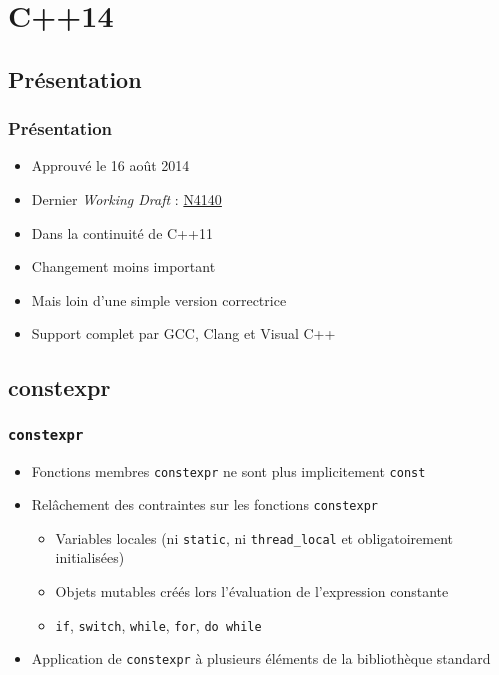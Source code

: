 \documentclass[C++.tex]{subfiles}
\begin{document}
\section{C++14}
\subsection*{Présentation}
\begin{frame}
	\frametitle{Présentation}
	\begin{itemize}
		\item Approuvé le 16 août 2014
		\item Dernier \textit{Working Draft} : \href{https://timsong-cpp.github.io/cppwp/n4140/draft.pdf}{N4140}
		\item Dans la continuité de C++11
		\item Changement moins important
		\item Mais loin d'une simple version correctrice
		\item Support complet par GCC, Clang et Visual C++
	\end{itemize}
\end{frame}

\subsection*{constexpr}
\begin{frame}[fragile]
	\frametitle{\lstinline|constexpr|}
	\begin{itemize}
		\item Fonctions membres \lstinline|constexpr| ne sont plus implicitement \lstinline|const|
		\item Relâchement des contraintes sur les fonctions \lstinline|constexpr|
		\begin{itemize}
			\item Variables locales (ni \lstinline|static|, ni \lstinline|thread_local| et obligatoirement initialisées)
			\item Objets mutables créés lors l'évaluation de l'expression constante
			\item \lstinline|if|, \lstinline|switch|, \lstinline|while|, \lstinline|for|, \lstinline|do while|
		\end{itemize}
		\item Application de \lstinline|constexpr| à plusieurs éléments de la bibliothèque standard
	\end{itemize}
\end{frame}
\end{document}
